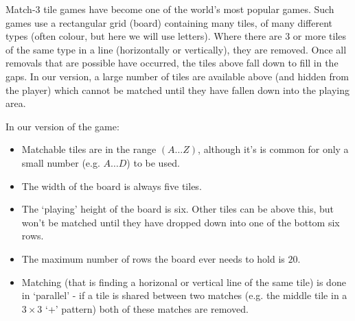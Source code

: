 
Match-3 tile games have become one of the world's most popular games.
Such games use a rectangular grid (board)
containing many tiles, of many different types
(often colour, but here we will use letters). Where there are $3$ or
more tiles of the same type in a line (horizontally or vertically),
they are removed. Once all removals that are possible have occurred,
the tiles above fall down to fill in the gaps. In our version, a large
number of tiles are available above (and hidden from the player) which
cannot be matched until they have fallen down into the playing area.

In our version of the game:
\begin{itemize}
\item Matchable tiles are in the range $(A \ldots Z)$,
although it's is common for only a small
number (e.g. $A \ldots D$) to be used.
\item The width of the board is always five tiles.
\item The `playing' height of the board is six. Other tiles can be above this,
but won't be matched until they have dropped down into one of the bottom six rows.
\item The maximum number of rows the board ever needs to hold is $20$. 
\item Matching (that is finding a horizonal or vertical line of the same tile)
is done in `parallel' - if a tile is shared between two matches
(e.g. the middle tile in a $3\times 3$ `+' pattern) both of these matches are
removed.
\end{itemize}

